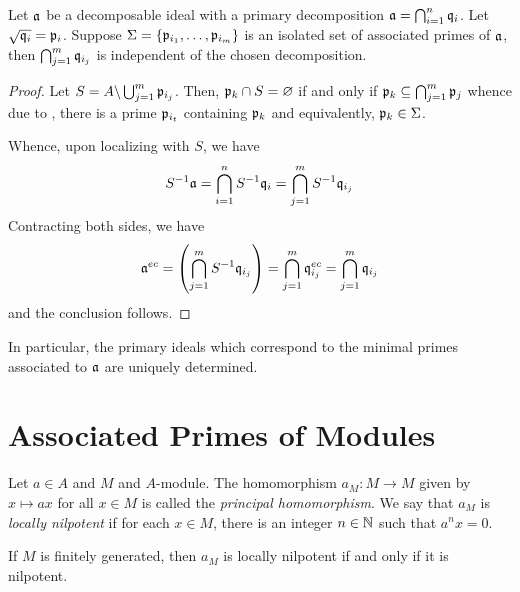 \begin{theorem}
    Let $\mathfrak a$ be a decomposable ideal with a primary decomposition $\mathfrak a = \bigcap_{i = 1}^n\mathfrak q_i$. Let $\sqrt{\mathfrak q_i} = \mathfrak p_i$. Suppose $\Sigma = \{\mathfrak p_{i_1},\ldots,\mathfrak p_{i_m}\}$ is an isolated set of associated primes of $\mathfrak a$, then $\bigcap_{j = 1}^m\mathfrak q_{i_j}$ is independent of the chosen decomposition.
\end{theorem}
\begin{proof}
    Let $S = A\backslash\bigcup_{j = 1}^m\mathfrak p_{i_j}$. Then, $\mathfrak p_k\cap S = \varnothing$ if and only if $\mathfrak p_k\subseteq\bigcap_{j = 1}^m\mathfrak p_j$ whence due to , there is a prime $\mathfrak p_{i_t}$ containing $\mathfrak p_k$ and equivalently, $\mathfrak p_k\in\Sigma$. 

    Whence, upon localizing with $S$, we have 
    \begin{equation*}
        S^{-1}\mathfrak a = \bigcap_{i = 1}^n S^{-1}\mathfrak q_i = \bigcap_{j = 1}^m S^{-1}\mathfrak q_{i_j}
    \end{equation*}
    Contracting both sides, we have 
    \begin{equation*}
        \mathfrak a^{ec} = \left(\bigcap_{j = 1}^m S^{-1}\mathfrak q_{i_j}\right) = \bigcap_{j = 1}^m\mathfrak q_{i_j}^{ec} = \bigcap_{j = 1}^m\mathfrak q_{i_j}
    \end{equation*}
    and the conclusion follows.
\end{proof}

\begin{corollary}
    In particular, the primary ideals which correspond to the minimal primes associated to $\mathfrak a$ are uniquely determined.
\end{corollary}

\section{Associated Primes of Modules}

\begin{definition}
    Let $a\in A$ and $M$ and $A$-module. The homomorphism $a_M: M\to M$ given by $x\mapsto ax$ for all $x\in M$ is called the \emph{principal homomorphism}. We say that $a_M$ is \emph{locally nilpotent} if for each $x\in M$, there is an integer $n\in\mathbb{N}$ such that $a^n x = 0$.
\end{definition}

\begin{remark}
    If $M$ is finitely generated, then $a_M$ is locally nilpotent if and only if it is nilpotent.
\end{remark}

